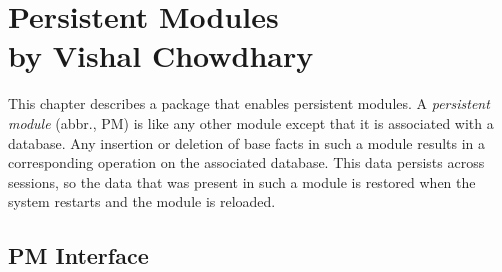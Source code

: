 \chapter[Persistent Modules]{Persistent Modules\\{by Vishal Chowdhary}}



\newcommand{\psm}{\mbox{PM}\xspace}

This chapter describes a \FLORA package that enables persistent modules.  A
\emph{persistent module} (abbr., \psm) is like any other \FLORA module
except that it is associated with a database. Any insertion or deletion of
base facts in such a module results in a corresponding operation on the
associated database. This data persists across \FLORA sessions, so the data
that was present in such a module is restored when the system restarts and
the module is reloaded.
  

\section{PM Interface}

